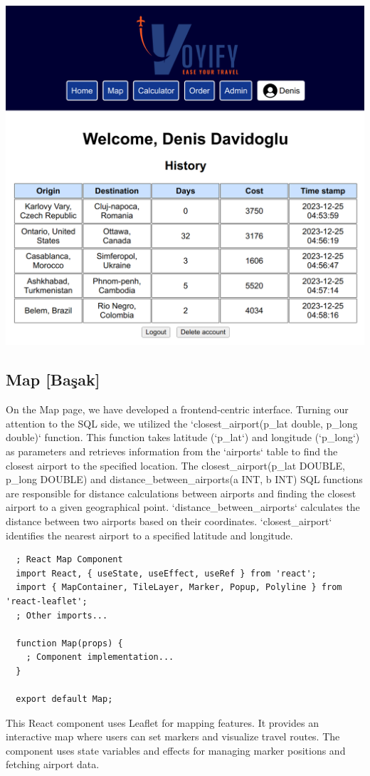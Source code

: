 \documentclass[12pt]{article}
\begin{document}
\begin{center}
\includegraphics[width=\textwidth]{./images/loggedin.png}
\end{center}
\subsection{Map [Başak]}
\label{sec:org613d05e}
On the Map page, we have developed a frontend-centric interface. Turning our attention to the SQL side, we utilized the `closest\_airport(p\_lat double, p\_long double)` function. This function takes latitude (`p\_lat`) and longitude (`p\_long`) as parameters and retrieves information from the `airports` table to find the closest airport to the specified location. The closest\_airport(p\_lat DOUBLE, p\_long DOUBLE) and distance\_between\_airports(a INT, b INT) SQL functions are responsible for distance calculations between airports and finding the closest airport to a given geographical point. `distance\_between\_airports` calculates the distance between two airports based on their coordinates. `closest\_airport` identifies the nearest airport to a specified latitude and longitude.

\begin{verbatim}
  ; React Map Component
  import React, { useState, useEffect, useRef } from 'react';
  import { MapContainer, TileLayer, Marker, Popup, Polyline } from 'react-leaflet';
  ; Other imports...

  function Map(props) {
    ; Component implementation...
  }

  export default Map;
\end{verbatim}
This React component uses Leaflet for mapping features. It provides an interactive map where users can set markers and visualize travel routes. The component uses state variables and effects for managing marker positions and fetching airport data.
\end{document}
